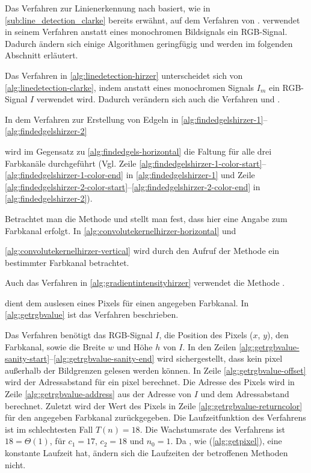 Das Verfahren zur Linienerkennung nach \citeauthor{hirzer08} basiert, wie in \autoref{sub:line_detection_clarke} bereits
 erwähnt, auf dem Verfahren von \citeauthor{clarke96}. \citeauthor{hirzer08} verwendet in seinem Verfahren anstatt
 eines monochromen Bildsignals ein RGB-Signal. Dadurch ändern sich einige Algorithmen geringfügig und werden im
 folgenden Abschnitt erläutert.

Das Verfahren in \autoref{alg:linedetection-hirzer} unterscheidet sich von \autoref{alg:linedetection-clarke}, indem
 anstatt eines monochromen Signals $I_m$ ein RGB-Signal $I$ verwendet wird. Dadurch verändern sich auch die Verfahren
  und .

In dem Verfahren zur Erstellung von Edgeln in \autoref{alg:findedgelshirzer-1}--\autoref{alg:findedgelshirzer-2}

wird im Gegensatz zu \autoref{alg:findedgels-horizontal} die Faltung für alle drei Farbkanäle durchgeführt (Vgl. Zeile
 \ref{alg:findedgelshirzer-1-color-start}--\ref{alg:findedgelshirzer-1-color-end} in \autoref{alg:findedgelshirzer-1}
 und Zeile \ref{alg:findedgelshirzer-2-color-start}--\ref{alg:findedgelshirzer-2-color-end} in
 \autoref{alg:findedgelshirzer-2}).

Betrachtet man die Methode  und  stellt man fest, dass hier eine
 Angabe zum Farbkanal erfolgt. In \autoref{alg:convolutekernelhirzer-horizontal} und

 \autoref{alg:convolutekernelhirzer-vertical} wird durch den Aufruf der Methode  ein bestimmter
 Farbkanal betrachtet.

Auch das Verfahren  in \autoref{alg:gradientintensityhirzer} verwendet die Methode
 .


 dient dem auslesen eines Pixels für einen angegeben Farbkanal. In \autoref{alg:getrgbvalue} ist das Verfahren beschrieben.

Das Verfahren benötigt das RGB-Signal $I$, die Position des Pixels ($x$, $y$), den Farbkanal, sowie die Breite $w$
 und Höhe $h$ von $I$. In den Zeilen \ref{alg:getrgbvalue-sanity-start}--\ref{alg:getrgbvalue-sanity-end} wird
 sichergestellt, dass kein \gls{pixel} außerhalb der Bildgrenzen gelesen werden können. In Zeile
 \ref{alg:getrgbvalue-offset} wird der Adressabstand für ein \gls{pixel} berechnet. Die Adresse des Pixels wird in
 Zeile \ref{alg:getrgbvalue-address} aus der Adresse von $I$ und dem Adressabstand berechnet. Zuletzt wird der Wert des
 Pixels in Zeile \ref{alg:getrgbvalue-returncolor} für den angegeben Farbkanal zurückgegeben. Die Laufzeitfunktion
 des Verfahrens ist im schlechtesten Fall $T(n) = 18$. Die Wachstumsrate des Verfahrens ist $18 = \Theta(1)$, für
 $c_{1} = 17$, $c_{2} = 18$ und $n_{0} = 1$. Da , wie 
 (\autoref{alg:getpixel}), eine konstante Laufzeit hat, ändern sich die Laufzeiten der betroffenen Methoden nicht.

